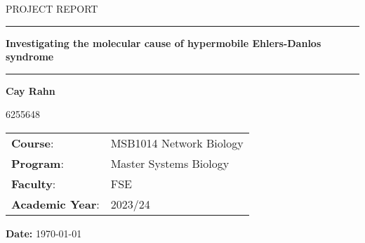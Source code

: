 \documentclass[onecolumn, a4paper,10pt, headings=normal, titlepage=true]{scrartcl}
\begin{document}
\begin{titlepage}
	\thispagestyle{empty}

	\begin{minipage}[t]{\textwidth}
	
	\Large{\uppercase{Project report}}
	
	\vspace{2cm}
	
	\rule{\textwidth}{1pt}
	
	\vspace{0.5cm}
	
	\textbf{\huge{Investigating the molecular cause of hypermobile Ehlers-Danlos syndrome}}
	
	\rule{\textwidth}{1pt}
	
	\vspace{7cm}
	
	\LARGE{\textbf{Cay Rahn}}
	
	\large{6255648}

	\vspace{3cm}
	
	\large{
	\noindent\begin{tabular}{@{}ll}
		\textbf{Course}:& MSB1014 Network Biology\\
		\textbf{Program}:& Master Systems Biology\\
		\textbf{Faculty}:& FSE\\
		\textbf{Academic Year}:& 2023/24
	\end{tabular}
	}
	\end{minipage}
	
	\vspace{2cm}
	\large{\textbf{Date:} \today}
	
\end{titlepage}
\clearpage
{}
\setcounter{page}{1}








\clearpage


\end{document}
